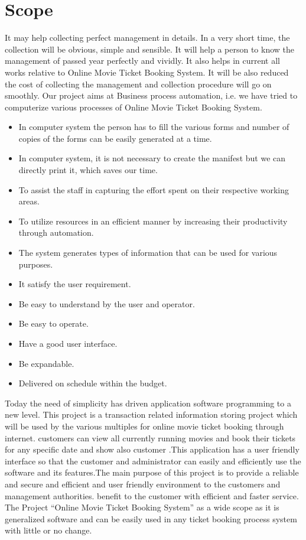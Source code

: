 \documentclass[oneside,a4paper,12pt]{report}
\begin{document}
\section{Scope}
It may help collecting perfect management in details. In a very short time, the collection will be obvious, simple and sensible. It will help a person to know the management of passed year perfectly and vividly. It also helps in current all works relative to Online Movie Ticket Booking System. It will be also reduced the cost of collecting the management and collection procedure will go on smoothly. 
Our project aims at Business process automation, i.e. we have tried to computerize various processes of Online Movie Ticket Booking System. 
\begin{itemize}
    \item In computer system the person has to fill the various forms and number of copies of the forms can be easily generated at a time. 
    \item In computer system, it is not necessary to create the manifest but we can directly print it, which saves our time. 
    \item To assist the staff in capturing the effort spent on their respective working areas.
    \item To utilize resources in an efficient manner by increasing their productivity through automation. 
    \item The system generates types of information that can be used for various purposes. 
    \item It satisfy the user requirement.
    \item Be easy to understand by the user and operator.
    \item Be easy to operate. 
    \item Have a good user interface. 
    \item Be expandable.
    \item Delivered on schedule within the budget. 
\end{itemize}
\hspace*{0.3 in}Today the need of simplicity has driven application software programming to a new level. This project is a transaction related information storing project which will be used by the various multiples for online movie ticket booking through internet. customers can view all currently running movies and book their tickets for any specific date and show also customer .This application has a user friendly interface so that the customer and administrator can easily and efficiently use the software and its features.The main purpose of this project is to provide a reliable and secure and efficient and user friendly environment to the customers and management authorities. benefit to the customer with efficient and faster service. The Project “Online Movie Ticket Booking System” as a wide scope as it is generalized software and can be easily used in any ticket booking process system with little or no change.
\end{document}
